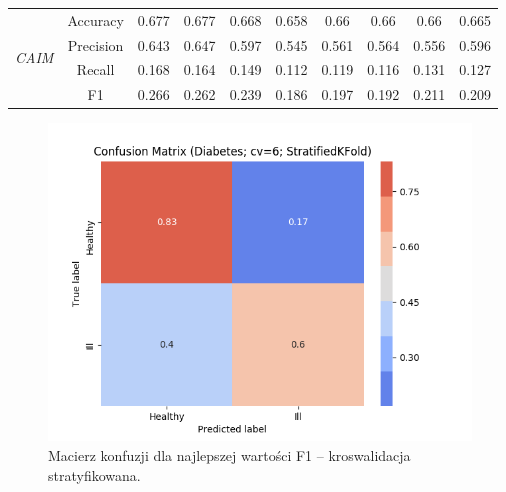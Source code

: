 \begin{table}[H]
\begin{tabular}{|c|c|c|c|c|c|c|c|c|c|}
        \multirow{4}{*}{\textit{CAIM}}  & Accuracy & 0.677 & 0.677 & 0.668 & 0.658 & 0.66 & 0.66 & 0.66 & 0.665 \\ \cline{2-10}
                                         & Precision & 0.643 & 0.647 & 0.597 & 0.545 & 0.561 & 0.564 & 0.556 & 0.596 \\ \cline{2-10}
                                         & Recall & 0.168 & 0.164 & 0.149 & 0.112 & 0.119 & 0.116 & 0.131 & 0.127 \\ \cline{2-10}
                                         & F1 & 0.266 & 0.262 & 0.239 & 0.186 & 0.197 & 0.192 & 0.211 & 0.209 \\ \hline \hline

            \hline
    \end{tabular}
\end{table}

\begin{figure}[H]
    \includegraphics[width=\textwidth]{img/conf_matrices/cm_Diabetes_cv6_StratifiedKFold.png}
    \caption{Macierz konfuzji dla najlepszej wartości F1 -- kroswalidacja stratyfikowana.}
\end{figure}
